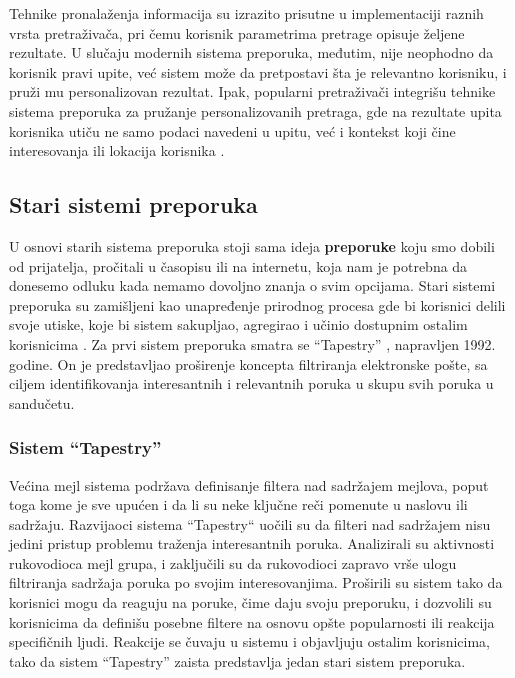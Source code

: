 \documentclass[a4paper]{article}
\begin{document}
Tehnike pronalaženja informacija su izrazito prisutne u implementaciji raznih vrsta pretraživača, pri čemu korisnik parametrima pretrage opisuje željene rezultate. U slučaju modernih sistema preporuka, međutim, nije neophodno da korisnik pravi upite, već sistem može da pretpostavi šta je relevantno korisniku, i pruži mu personalizovan rezultat. Ipak, popularni pretraživači integrišu tehnike sistema preporuka za pružanje personalizovanih pretraga, gde na rezultate upita korisnika utiču ne samo podaci navedeni u upitu, već i kontekst koji čine interesovanja ili lokacija korisnika \cite{aggarwal_recommender_2016}.

\subsection{Stari sistemi preporuka}
\label{subsec:stari_sistemi_preporuka}

U osnovi starih sistema preporuka stoji sama ideja \textbf{preporuke} koju smo dobili od prijatelja, pročitali u časopisu ili na internetu, koja nam je potrebna da donesemo odluku kada nemamo dovoljno znanja o svim opcijama. Stari sistemi preporuka su zamišljeni kao unapređenje prirodnog procesa gde bi korisnici delili svoje utiske, koje bi sistem sakupljao, agregirao i učinio dostupnim ostalim korisnicima \cite{resnick_recommender_1997}. Za prvi sistem preporuka smatra se ``Tapestry'' \cite{goldberg_using_1992}, napravljen 1992. godine. On je predstavljao proširenje koncepta filtriranja elektronske pošte, sa ciljem identifikovanja interesantnih i relevantnih poruka u skupu svih poruka u sandučetu.

\subsubsection{Sistem ``Tapestry''}
\label{subsubsec:tapestry}

Većina mejl sistema podržava definisanje filtera nad sadržajem mejlova, poput toga kome je sve upućen i da li su neke ključne reči pomenute u naslovu ili sadržaju. Razvijaoci sistema ``Tapestry`` uočili su da filteri nad sadržajem nisu jedini pristup problemu traženja interesantnih poruka. Analizirali su aktivnosti rukovodioca mejl grupa, i zaključili su da rukovodioci zapravo vrše ulogu filtriranja sadržaja poruka po svojim interesovanjima. Proširili su sistem tako da korisnici mogu da reaguju na poruke, čime daju svoju preporuku, i dozvolili su korisnicima da definišu posebne filtere na osnovu opšte popularnosti ili reakcija specifičnih ljudi. Reakcije se čuvaju u sistemu i objavljuju ostalim korisnicima, tako da sistem ``Tapestry'' zaista predstavlja jedan stari sistem preporuka.
\end{document}
